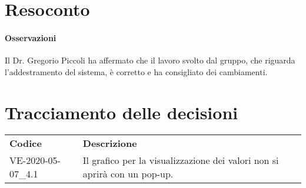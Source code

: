 \documentclass{article}
\begin{document}
\section{Resoconto}%
\label{resoconto}
\paragraph*{Osservazioni}
Il Dr. Gregorio Piccoli ha affermato che il lavoro svolto dal gruppo, che riguarda l'addestramento del sistema, è corretto e ha consigliato dei cambiamenti.

\section{Tracciamento delle decisioni}
\begin{table}[H]
  \centering
  \begin{tabular}{p{4cm}|p{12cm}}
    \rowcolor{lightgray}
    \textbf{Codice}  & \textbf{Descrizione}      \\
    VE-2020-05-07\_4.1 & Il grafico per la visualizzazione dei valori non si aprirà con un pop-up. \\
  \end{tabular}
\end{table}
\end{document}
